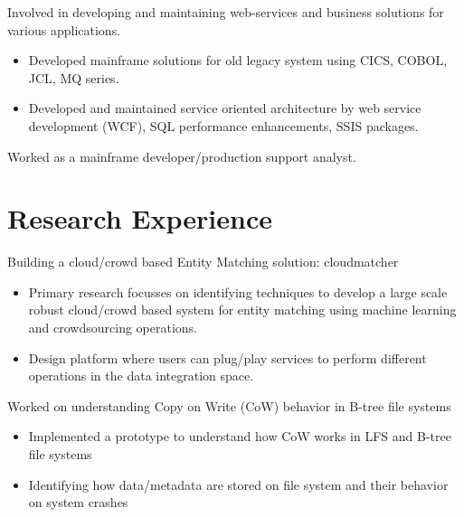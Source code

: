 \documentclass{resume}
\begin{document}
Involved in developing and maintaining web-services and business solutions for various applications.
\begin{itemize}
  \item Developed mainframe solutions for old legacy system using CICS, COBOL, JCL, MQ series.
  \item Developed and maintained service oriented architecture by web service development (WCF), SQL performance enhancements, SSIS packages.
\end{itemize}

Worked as a mainframe developer/production support analyst.

\section{Research Experience}
Building a cloud/crowd based Entity Matching solution: cloudmatcher
\begin{itemize}
  \item Primary research focusses on identifying techniques to develop a large scale robust cloud/crowd based system for entity matching using machine learning
and crowdsourcing operations.
  \item Design platform where users can plug/play services to perform different operations in the data integration space.
\end{itemize}

Worked on understanding Copy on Write (CoW) behavior in B-tree file systems 
\begin{itemize}
  \item Implemented a prototype to understand how CoW works in LFS and B-tree file systems
  \item Identifying how data/metadata are stored on file system and their behavior on system crashes
\end{itemize}
\end{document}
